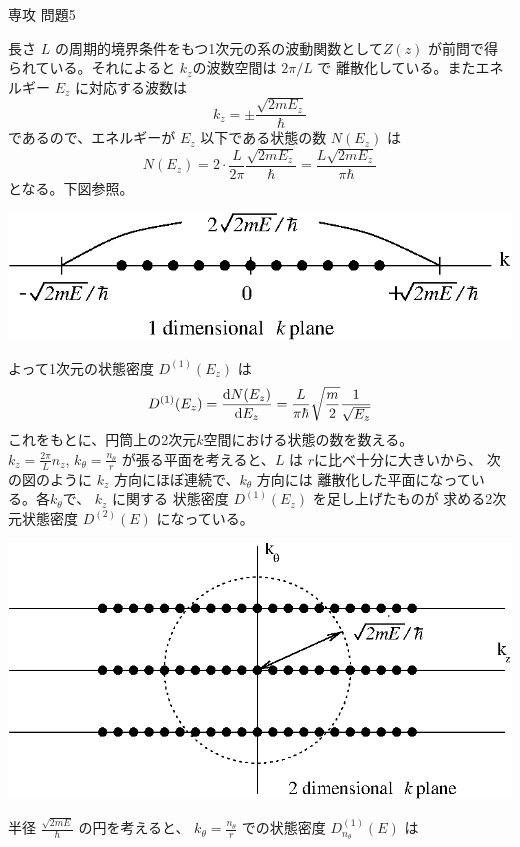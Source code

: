 \documentclass[fleqn]{jbook}
\begin{document}
\begin{answer}{専攻 問題5}{}
\begin{subanswers}
\begin{subsubanswers}
  \SubSubAnswer
    長さ $L$ の周期的境界条件をもつ1次元の系の波動関数として$Z(z)$
    が前問で得られている。それによると $k_z$の波数空間は $2\pi/L$ で
    離散化している。またエネルギー $E_z$ に対応する波数は
%
    \[ k_z = \pm\frac{\sqrt{2mE_z}}{\hbar} \]
%
    であるので、エネルギーが $E_z$ 以下である状態の数 $N(E_z)$ は
%
    \[ N(E_z) = 2 \cdot \frac{L}{2\pi} \frac{\sqrt{2mE_z}}{\hbar}%
              = \frac{L\sqrt{2mE_z}}{\pi\hbar} \]
%
    となる。下図参照。
%
    \begin{center}
      \mbox{\includegraphics[clip]{1995phy5-2.eps}}
    \end{center}
%
    よって1次元の状態密度 $D^{(1)}(E_z)$ は
%
    \[ D^{(1)}(E_z) = \Deriver{N(E_z)}{E_z}%
      = \frac{L}{\pi\hbar}\sqrt{\frac{m}{2}} \frac{1}{\sqrt{E_z}} \]
%
    これをもとに、円筒上の2次元$k$空間における状態の数を数える。
    $k_z=\frac{2\pi}{L}n_z,\,k_\theta=\frac{n_\theta}{r}$
    が張る平面を考えると、$L$ は $r$に比べ十分に大きいから、
    次の図のように $k_z$ 方向にほぼ連続で、$k_\theta$ 方向には
    離散化した平面になっている。各$k_\theta$で、 $k_z$ に関する
    状態密度 $D^{(1)}(E_z)$ を足し上げたものが
    求める2次元状態密度 $D^{(2)}(E)$ になっている。
%
    \begin{center}\vspace*{-2mm}
      \mbox{\includegraphics[clip]{1995phy5-3.eps}}
    \end{center}
%
    半径 $\frac{\sqrt{2mE}}{\hbar}$ の円を考えると、
    $k_\theta=\frac{n_{\theta}}{r}$
    での状態密度 $D^{(1)}_{n_{\theta}}(E)$ は

\end{subsubanswers}
\end{subanswers}
\end{answer}
\end{document}
